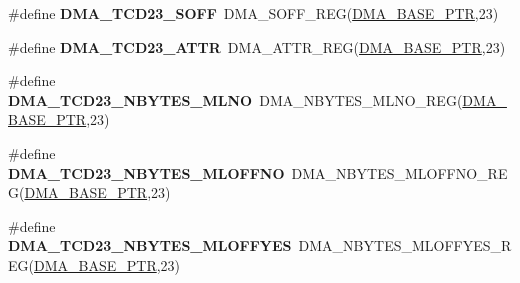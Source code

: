 \begin{DoxyCompactItemize}
\item 
\hypertarget{group___d_m_a___register___accessor___macros_ga450ffcbcd4625ea66ec3946f9f03ea56}{}\#define {\bfseries D\+M\+A\+\_\+\+T\+C\+D23\+\_\+\+S\+O\+F\+F}~D\+M\+A\+\_\+\+S\+O\+F\+F\+\_\+\+R\+E\+G(\hyperlink{group___d_m_a___peripheral_ga6997fbc1b1973e9f27170217a3bd6f22}{D\+M\+A\+\_\+\+B\+A\+S\+E\+\_\+\+P\+T\+R},23)\label{group___d_m_a___register___accessor___macros_ga450ffcbcd4625ea66ec3946f9f03ea56}

\item 
\hypertarget{group___d_m_a___register___accessor___macros_gafd68bf34f9fcb1d8490b728ac4d13be3}{}\#define {\bfseries D\+M\+A\+\_\+\+T\+C\+D23\+\_\+\+A\+T\+T\+R}~D\+M\+A\+\_\+\+A\+T\+T\+R\+\_\+\+R\+E\+G(\hyperlink{group___d_m_a___peripheral_ga6997fbc1b1973e9f27170217a3bd6f22}{D\+M\+A\+\_\+\+B\+A\+S\+E\+\_\+\+P\+T\+R},23)\label{group___d_m_a___register___accessor___macros_gafd68bf34f9fcb1d8490b728ac4d13be3}

\item 
\hypertarget{group___d_m_a___register___accessor___macros_gac830d5667e92e4b4e69f47e87e81764b}{}\#define {\bfseries D\+M\+A\+\_\+\+T\+C\+D23\+\_\+\+N\+B\+Y\+T\+E\+S\+\_\+\+M\+L\+N\+O}~D\+M\+A\+\_\+\+N\+B\+Y\+T\+E\+S\+\_\+\+M\+L\+N\+O\+\_\+\+R\+E\+G(\hyperlink{group___d_m_a___peripheral_ga6997fbc1b1973e9f27170217a3bd6f22}{D\+M\+A\+\_\+\+B\+A\+S\+E\+\_\+\+P\+T\+R},23)\label{group___d_m_a___register___accessor___macros_gac830d5667e92e4b4e69f47e87e81764b}

\item 
\hypertarget{group___d_m_a___register___accessor___macros_gac799538c370f9ee8e4c5ead9279da385}{}\#define {\bfseries D\+M\+A\+\_\+\+T\+C\+D23\+\_\+\+N\+B\+Y\+T\+E\+S\+\_\+\+M\+L\+O\+F\+F\+N\+O}~D\+M\+A\+\_\+\+N\+B\+Y\+T\+E\+S\+\_\+\+M\+L\+O\+F\+F\+N\+O\+\_\+\+R\+E\+G(\hyperlink{group___d_m_a___peripheral_ga6997fbc1b1973e9f27170217a3bd6f22}{D\+M\+A\+\_\+\+B\+A\+S\+E\+\_\+\+P\+T\+R},23)\label{group___d_m_a___register___accessor___macros_gac799538c370f9ee8e4c5ead9279da385}

\item 
\hypertarget{group___d_m_a___register___accessor___macros_ga65eceb17e64b0866b63f3b09b7981e8a}{}\#define {\bfseries D\+M\+A\+\_\+\+T\+C\+D23\+\_\+\+N\+B\+Y\+T\+E\+S\+\_\+\+M\+L\+O\+F\+F\+Y\+E\+S}~D\+M\+A\+\_\+\+N\+B\+Y\+T\+E\+S\+\_\+\+M\+L\+O\+F\+F\+Y\+E\+S\+\_\+\+R\+E\+G(\hyperlink{group___d_m_a___peripheral_ga6997fbc1b1973e9f27170217a3bd6f22}{D\+M\+A\+\_\+\+B\+A\+S\+E\+\_\+\+P\+T\+R},23)\label{group___d_m_a___register___accessor___macros_ga65eceb17e64b0866b63f3b09b7981e8a}


\end{DoxyCompactItemize}
